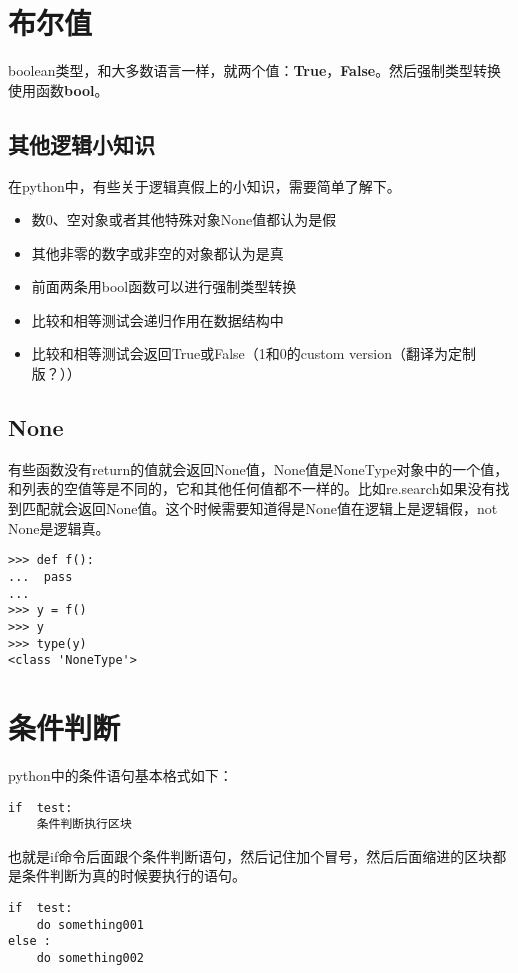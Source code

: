 \documentclass[12pt,oneside]{book}
\begin{document}
\begin{common-format}
\section{布尔值}
\label{sec:布尔值}
boolean类型，和大多数语言一样，就两个值：\textbf{True}，\textbf{False}。然后强制类型转换使用函数\textbf{bool}。

\subsection{其他逻辑小知识}
在python中，有些关于逻辑真假上的小知识，需要简单了解下。
\begin{itemize}
\item 数0、空对象或者其他特殊对象None值都认为是假
\item 其他非零的数字或非空的对象都认为是真
\item 前面两条用bool函数可以进行强制类型转换
\item 比较和相等测试会递归作用在数据结构中
\item 比较和相等测试会返回True或False（1和0的custom version（翻译为定制版？））
\end{itemize}

\subsection{None}
有些函数没有return的值就会返回None值，None值是NoneType对象中的一个值，和列表的空值等是不同的，它和其他任何值都不一样的。比如re.search如果没有找到匹配就会返回None值。这个时候需要知道得是None值在逻辑上是逻辑假，not None是逻辑真。
\begin{Verbatim}
>>> def f():
...  pass
... 
>>> y = f()
>>> y
>>> type(y)
<class 'NoneType'>
\end{Verbatim}




\section{条件判断}
python中的条件语句基本格式如下：
\begin{Verbatim}
if  test:
    条件判断执行区块
\end{Verbatim}

也就是if命令后面跟个条件判断语句，然后记住加个冒号，然后后面缩进的区块都是条件判断为真的时候要执行的语句。

\begin{Verbatim}
if  test:
    do something001
else :
    do something002
\end{Verbatim}


\end{common-format}
\end{document}
